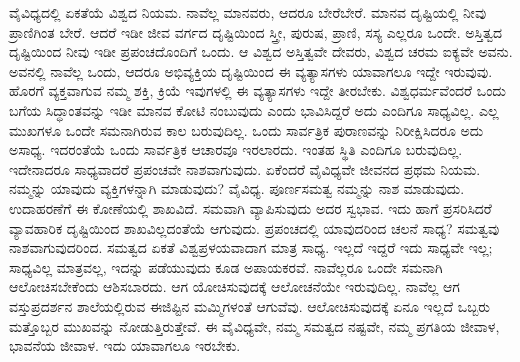 ವೈವಿಧ್ಯದಲ್ಲಿ ಏಕತೆಯೆ ವಿಶ್ವದ ನಿಯಮ. ನಾವೆಲ್ಲ ಮಾನವರು, ಆದರೂ ಬೇರೆಬೇರೆ. ಮಾನವ ದೃಷ್ಟಿಯಲ್ಲಿ ನೀವು ಪ್ರಾಣಿಗಿಂತ ಬೇರೆ. ಆದರೆ ಇಡೀ ಜೀವ ವರ್ಗದ ದೃಷ್ಟಿಯಿಂದ ಸ್ತ್ರೀ, ಪುರುಷ, ಪ್ರಾಣಿ, ಸಸ್ಯ ಎಲ್ಲರೂ ಒಂದೇ. ಅಸ್ತಿತ್ವದ ದೃಷ್ಟಿಯಿಂದ ನೀವು ಇಡೀ ಪ್ರಪಂಚದೊಂದಿಗೆ ಒಂದು. ಆ ವಿಶ್ವದ ಅಸ್ತಿತ್ವವೇ ದೇವರು, ವಿಶ್ವದ ಚರಮ ಐಕ್ಯವೇ ಅವನು. ಅವನಲ್ಲಿ ನಾವೆಲ್ಲ ಒಂದು, ಆದರೂ ಅಭಿವ್ಯಕ್ತಿಯ ದೃಷ್ಟಿಯಿಂದ ಈ ವ್ಯತ್ಯಾಸಗಳು ಯಾವಾಗಲೂ ಇದ್ದೇ ಇರುವುವು. ಹೊರಗೆ ವ್ಯಕ್ತವಾಗುವ ನಮ್ಮ ಶಕ್ತಿ, ಕ್ರಿಯೆ ಇವುಗಳಲ್ಲಿ ಈ ವ್ಯತ್ಯಾಸಗಳು ಇದ್ದೇ ತೀರಬೇಕು. ವಿಶ್ವಧರ್ಮವೆಂದರೆ ಒಂದು ಬಗೆಯ ಸಿದ್ಧಾಂತವನ್ನು ಇಡೀ ಮಾನವ ಕೋಟಿ ನಂಬುವುದು ಎಂದು ಭಾವಿಸಿದ್ದರೆ ಅದು ಎಂದಿಗೂ ಸಾಧ್ಯವಿಲ್ಲ. ಎಲ್ಲ ಮುಖಗಳೂ ಒಂದೇ ಸಮನಾಗಿರುವ ಕಾಲ ಬರುವುದಿಲ್ಲ. ಒಂದು ಸಾರ್ವತ್ರಿಕ ಪುರಾಣವನ್ನು ನಿರೀಕ್ಷಿಸಿದರೂ ಅದು ಅಸಾಧ್ಯ. ಇದರಂತೆಯೆ ಒಂದು ಸಾರ್ವತ್ರಿಕ ಆಚಾರವೂ ಇರಲಾರದು. ಇಂತಹ ಸ್ಥಿತಿ ಎಂದಿಗೂ ಬರುವುದಿಲ್ಲ. ಇದೇನಾದರೂ ಸಾಧ್ಯವಾದರೆ ಪ್ರಪಂಚವೇ ನಾಶವಾಗುವುದು. ಏಕೆಂದರೆ ವೈವಿಧ್ಯವೇ ಜೀವನದ ಪ್ರಥಮ ನಿಯಮ. ನಮ್ಮನ್ನು ಯಾವುದು ವ್ಯಕ್ತಿಗಳನ್ನಾಗಿ ಮಾಡುವುದು? ವೈವಿಧ್ಯ. ಪೂರ್ಣಸಮತ್ವ ನಮ್ಮನ್ನು ನಾಶ ಮಾಡುವುದು. ಉದಾಹರಣೆಗೆ ಈ ಕೋಣೆಯಲ್ಲಿ ಶಾಖವಿದೆ. ಸಮವಾಗಿ ವ್ಯಾಪಿಸುವುದು ಅದರ ಸ್ವಭಾವ. ಇದು ಹಾಗೆ ಪ್ರಸರಿಸಿದರೆ ವ್ಯಾವಹಾರಿಕ ದೃಷ್ಟಿಯಿಂದ ಶಾಖವಿಲ್ಲದಂತೆಯೆ ಆಗುವುದು. ಪ್ರಪಂಚದಲ್ಲಿ ಯಾವುದರಿಂದ ಚಲನೆ ಸಾಧ್ಯ? ಸಮತ್ವವು ನಾಶವಾಗುವುದರಿಂದ. ಸಮತ್ವದ ಏಕತೆ ವಿಶ್ವಪ್ರಳಯವಾದಾಗ ಮಾತ್ರ ಸಾಧ್ಯ. ಇಲ್ಲದೆ ಇದ್ದರೆ ಇದು ಸಾಧ್ಯವೇ ಇಲ್ಲ; ಸಾಧ್ಯವಿಲ್ಲ ಮಾತ್ರವಲ್ಲ, ಇದನ್ನು ಪಡೆಯುವುದು ಕೂಡ ಅಪಾಯಕರವೆ. ನಾವೆಲ್ಲರೂ ಒಂದೇ ಸಮನಾಗಿ ಆಲೋಚಿಸಬೇಕೆಂದು ಆಶಿಸಬಾರದು. ಆಗ ಯೋಚಿಸುವುದಕ್ಕೆ ಆಲೋಚನೆಯೇ ಇರುವುದಿಲ್ಲ. ನಾವೆಲ್ಲ ಆಗ ವಸ್ತುಪ್ರದರ್ಶನ ಶಾಲೆಯಲ್ಲಿರುವ ಈಜಿಪ್ಟಿನ ಮಮ್ಮಿಗಳಂತೆ ಆಗುವೆವು. ಆಲೋಚಿಸುವುದಕ್ಕೆ ಏನೂ ಇಲ್ಲದೆ ಒಬ್ಬರು ಮತ್ತೊಬ್ಬರ ಮುಖವನ್ನು ನೋಡುತ್ತಿರುತ್ತೇವೆ. ಈ ವೈವಿಧ್ಯವೇ, ನಮ್ಮ ಸಮತ್ವದ ನಷ್ಟವೇ, ನಮ್ಮ ಪ್ರಗತಿಯ ಜೀವಾಳ, ಭಾವನೆಯ ಜೀವಾಳ. ಇದು ಯಾವಾಗಲೂ ಇರಬೇಕು.


